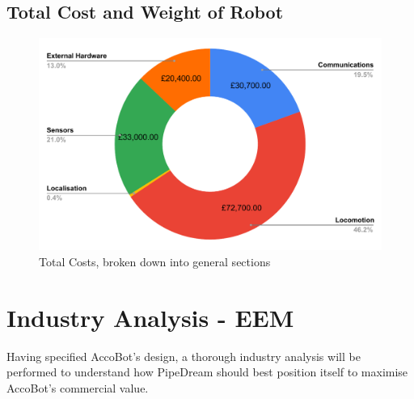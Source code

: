 \documentclass[11pt]{article}		%
\newlength{\imageheight}	 %
\begin{document}
		\subsection{Total Cost and Weight of Robot}
		\begin{figure}[H]
		    \centering
		    \includegraphics[height=\imageheight]{costBreakdown}
		    \caption{Total Costs, broken down into general sections}
		    \label{costBreakdown}
		\end{figure}
	\section{Industry Analysis - EEM}
		
	Having specified AccoBot's design, a thorough industry analysis will be performed to understand how PipeDream should best position itself to maximise AccoBot's commercial value. 
		
\end{document}
